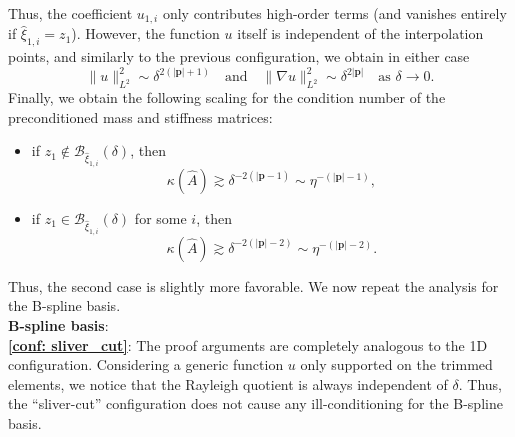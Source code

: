 \documentclass{article}
\numberwithin{equation}{section}
\theoremstyle{definition}
\begin{document}
Thus, the coefficient $u_{1,i}$ only contributes high-order terms (and vanishes entirely if $\hat{\xi}_{1,i}=z_1$). However, the function $u$ itself is independent of the interpolation points, and similarly to the previous configuration, we obtain in either case
\begin{equation*}
    \|u\|_{L^2}^2 \sim \delta^{2(|\bm{p}|+1)} \quad \text{and} \quad \|\nabla u\|_{L^2}^2 \sim \delta^{2|\bm{p}|} \quad \text{as } \delta \to 0.
\end{equation*}
Finally, we obtain the following scaling for the condition number of the preconditioned mass and stiffness matrices:
\begin{itemize}
    \item if $z_1 \notin \mathcal{B}_{\hat{\xi}_{1,i}}(\delta)$, then 
    \begin{equation*}
        \kappa(\hat{A}) \gtrsim \delta^{-2(|\bm{p}-1)} \sim \eta^{-(|\bm{p}|-1)},
    \end{equation*}
    \item if $z_1 \in \mathcal{B}_{\hat{\xi}_{1,i}}(\delta)$ for some $i$, then
    \begin{equation*}
        \kappa(\hat{A}) \gtrsim \delta^{-2(|\bm{p}|-2)} \sim \eta^{-(|\bm{p}|-2)}.
    \end{equation*}
\end{itemize}
Thus, the second case is slightly more favorable. We now repeat the analysis for the B-spline basis. \\

\noindent\textbf{B-spline basis}: \\
\noindent \textbf{\ref{conf: sliver_cut}}:
The proof arguments are completely analogous to the 1D configuration. Considering a generic function $u$ only supported on the trimmed elements, we notice that the Rayleigh quotient is always independent of $\delta$. Thus, the ``sliver-cut'' configuration does not cause any ill-conditioning for the B-spline basis. \\
\end{document}
